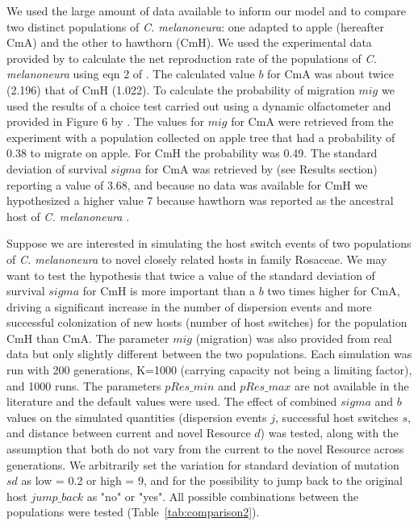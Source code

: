 We used the large amount of data available to inform our model and to compare two distinct populations of \textit{C. melanoneura}: one adapted to apple (hereafter CmA) and the other to hawthorn (CmH).
We used the experimental data provided by \citet{malagnini2013ecological} to calculate the net reproduction rate of the populations of \textit{C. melanoneura} using eqn 2 of \citet{garcia2011experimental}. The calculated value $b$ for CmA was about twice (2.196) that of CmH (1.022). To calculate the probability of migration $mig$ we used the results of a choice test carried out using a dynamic olfactometer and provided in Figure 6 by \citet{mayer2011chemically}. The values for $mig$ for CmA were retrieved from the experiment with a population collected on apple tree that had a probability of 0.38 to migrate on apple. For CmH the probability was 0.49. The standard deviation of survival $sigma$ for CmA was retrieved by \citet{malagnini2010study} (see Results section) reporting a value of 3.68, and because no data was available for CmH we hypothesized a higher value 7 because hawthorn was reported as the ancestral host of \textit{C. melanoneura} \citep{jackson1990cold}.

Suppose we are interested in simulating the host switch events of two populations of \textit{C. melanoneura} to novel closely related hosts in family Rosaceae. We may want to test the hypothesis that twice a value of the standard deviation of survival $sigma$ for CmH is more important than a $b$ two times higher for CmA, driving a significant increase in the number of dispersion events and more successful colonization of new hosts (number of host switches) for the population CmH than CmA. The parameter $mig$ (migration) was also provided from real data but only slightly different between the two populations. Each simulation was run with 200 generations, K=1000 (carrying capacity not being a limiting factor), and 1000 runs. The parameters $pRes\_min$ and $pRes\_max$ are not available in the literature and the default values were used. The effect of combined $sigma$ and $b$ values on the simulated quantities (dispersion events $j$, successful host switches $s$, and distance between current and novel Resource $d$) was tested, along with the assumption that both do not vary from the current to the novel Resource across generations. We arbitrarily set the variation for standard deviation of mutation $sd$ as low = 0.2 or high = 9, and for the possibility to jump back to the original host $jump\_back$ as "no" or "yes". All possible combinations between the populations were tested (Table~\ref{tab:comparison2}).

